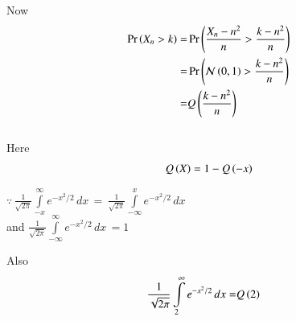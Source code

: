 \documentclass[journal,12pt,twocolumn]{IEEEtran}
\begin{document}
Now 
{
\begin{align}
    \Pr\left(X_n>k\right) =& \Pr\left(\frac{X_n-n^2}{n}>\frac{k-n^2}{n}\right)
    \\=& \Pr\left(\mathcal{N}\left(0,1\right)>\frac{k-n^2}{n}\right)
    \\ =& Q\left(\frac{k-n^2}{n}\right)
    \label{eq-cdf}
\end{align}
}
\vspace{0.2cm}
\\Here
\begin{align}
    Q\left(X\right)=1-Q\left(-x\right)
    \label{eq-Qx}
\end{align}
\begin{center}
    $\because \,{\frac{1}{\sqrt{2\pi}} \int \limits_{-x}^{\infty} e^{-x^2/2}\,dx}\,=\,{\frac{1}{\sqrt{2\pi}} \int \limits_{-\infty}^x e^{-x^2/2}\,dx}$
    \\ and \quad $\frac{1}{\sqrt{2\pi}} \int \limits_{-\infty}^{\infty} e^{-x^2/2}\,dx\,=1$
\end{center}
Also
\begin{align}
    \frac{1}{\sqrt{2\pi}} \int \limits_2^{\infty} e^{-x^2/2}\,dx=& Q\left(2\right)
\end{align}
\vspace{0.4cm}
\\
\end{document}
